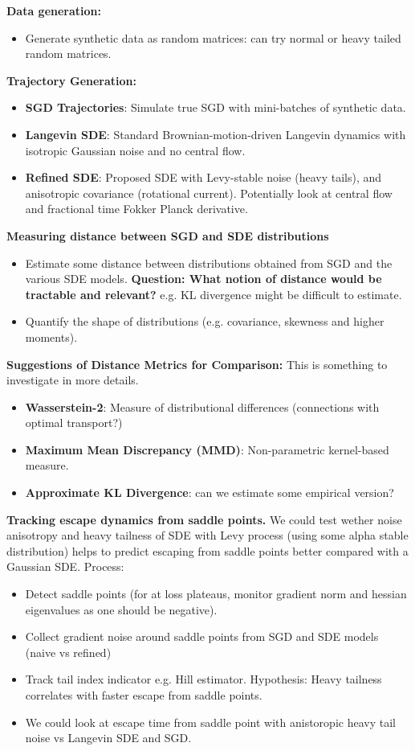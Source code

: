 \documentclass[11pt]{article}
\begin{document}
\textbf{Data generation:}
\begin{itemize}
\item Generate synthetic data as random matrices: can try normal or heavy tailed random matrices.
\end{itemize}
\textbf{Trajectory Generation:}
\begin{itemize}
\item \textbf{SGD Trajectories}: Simulate true SGD with mini-batches of synthetic data.
\item \textbf{Langevin SDE}: Standard Brownian-motion-driven Langevin dynamics with isotropic Gaussian noise and no central flow.
\item \textbf{Refined SDE}: Proposed SDE with Levy-stable noise (heavy tails), and anisotropic covariance (rotational current). Potentially look at central flow and fractional time Fokker Planck derivative.
\end{itemize}
\textbf{Measuring distance between SGD and SDE distributions}
\begin{itemize}
\item Estimate some distance between distributions obtained from SGD and the various SDE models. \textbf{Question: What notion of distance would be tractable and relevant?} e.g. KL divergence might be difficult to estimate. 
\item Quantify the shape of distributions (e.g. covariance, skewness and higher moments).
\end{itemize}
\textbf{Suggestions of Distance Metrics for Comparison:}
This is something to investigate in more details.
\begin{itemize}
\item \textbf{Wasserstein-2}: Measure of distributional differences (connections with optimal transport?)
\item \textbf{Maximum Mean Discrepancy (MMD)}: Non-parametric kernel-based measure.
\item \textbf{Approximate KL Divergence}: can we estimate some empirical version?
\end{itemize}
\textbf{Tracking escape dynamics from saddle points.}
We could test wether noise anisotropy and heavy tailness of SDE with Levy process (using some alpha stable distribution) helps to predict escaping from saddle points better compared with a Gaussian SDE.
Process:
\begin{itemize}
    \item Detect saddle points (for at loss plateaus, monitor gradient norm and hessian eigenvalues as one should be negative).
    \item Collect gradient noise around saddle points from SGD and SDE models (naive vs refined)
    \item Track tail index indicator e.g. Hill estimator. Hypothesis: Heavy tailness correlates with faster escape from saddle points.
    \item We could look at escape time from saddle point with anistoropic heavy tail noise vs Langevin SDE and SGD.
\end{itemize}
\end{document}

